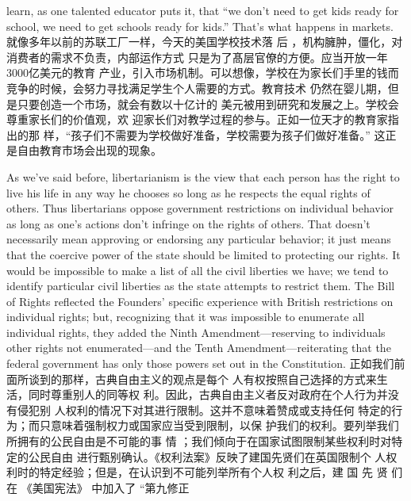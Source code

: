 \begin{paracol}{2}
learn, as one talented educator puts it, that ``we don't need to get kids ready for school, we need to get schools ready for kids.''
That's what happens in markets.
\switchcolumn
就像多年以前的苏联工厂一样，今天的美国学校技术落
后 ，机构臃肿，僵化，对消费者的需求不负责，内部运作方式
只是为了髙层官僚的方便。应当开放一年3000亿美元的教育
产业，引入市场机制。可以想像，学校在为家长们手里的钱而
竞争的时候，会努力寻找满足学生个人需要的方式。教育技术
仍然在婴儿期，但是只要创造一个市场，就会有数以十亿计的
美元被用到研究和发展之上。学校会尊重家长们的价值观，欢
迎家长们对教学过程的参与。正如一位天才的教育家指出的那
样，“孩子们不需要为学校做好准备，学校需要为孩子们做好准备。” 这正是自由教育市场会出现的现象。

As we've said before, libertarianism is the view that each person
has the right to live his life in any way he chooses so long as he
respects the equal rights of others. Thus libertarians oppose
government restrictions on individual behavior as long as one's
actions don't infringe on the rights of others. That doesn't necessarily mean approving or endorsing any particular behavior; it
just means that the coercive power of the state should be limited to protecting our rights. It would be impossible to make a
list of all the civil liberties we have; we tend to identify particular civil liberties as the state attempts to restrict them. The Bill
of Rights reflected the Founders' specific experience with
British restrictions on individual rights; but, recognizing that it
was impossible to enumerate all individual rights, they added
the Ninth Amendment---reserving to individuals other rights
not enumerated---and the Tenth Amendment---reiterating
that the federal government has only those powers set out in
the Constitution.
\switchcolumn
正如我们前面所谈到的那样，古典自由主义的观点是每个
人有权按照自己选择的方式来生活，同时尊重别人的同等权
利。因此，古典自由主义者反对政府在个人行为并没有侵犯别
人权利的情况下对其进行限制。这并不意味着赞成或支持任何
特定的行为；而只意味着强制权力或国家应当受到限制，以保
护我们的权利。要列举我们所拥有的公民自由是不可能的事
情 ；我们倾向于在国家试图限制某些权利时对特定的公民自由
进行甄别确认。《权利法案》反映了建国先贤们在英国限制个
人权利时的特定经验；但是，在认识到不可能列举所有个人权
利之后，建 国 先 贤 们 在 《美国宪法》 中加入了 “第九修正

\end{paracol}
